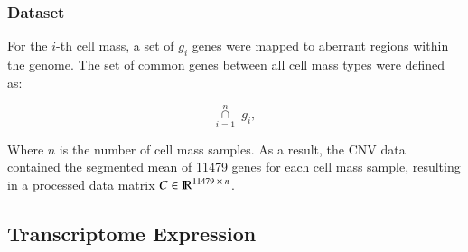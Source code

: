 \begin{table}[ht]
\caption{Significant CNV Abberations Mapped to Gene Ensembl ID in KIRC} %
\centering %
\label{table:mapgene}
\end{table}


\subsubsection{Dataset}

For the $i$-th cell mass, a set of $g_i$ genes were mapped to aberrant regions within the genome. The set of common genes between all cell mass types were defined as:

\begin{equation}
    \underset{i=1}{\overset{n}{\cap}} \; g_i,
\end{equation}

\noindent
Where $n$ is the number of cell mass samples. As a result, the CNV data contained the segmented mean of 11479 genes for each cell mass sample, resulting in a processed data matrix $C \in {\rm I\!R}^{11479 \; \times \; n}$.

\subsection{Transcriptome Expression}

